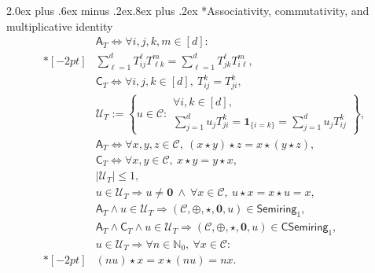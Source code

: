 \documentclass[10pt,a5paper]{article}
\makeatletter
\renewcommand\section{\@startsection{section}{1}{\z@}%
  {2.0ex plus .6ex minus .2ex}{.8ex plus .2ex}%
  {\normalfont\large\bfseries}}
\makeatother
\begin{document}
\section*{Associativity, commutativity, and multiplicative identity}
\begin{align*}
&\mathsf A_T
\iff{}
\forall i,j,k,m\in[d]:
\\*[-2pt]
&\sum_{\ell=1}^{d}
T_{ij}^{\ell}T_{\ell k}^{m}
=
\sum_{\ell=1}^{d}
T_{jk}^{\ell}T_{i\ell}^{m},
\\
&\mathsf C_T
\iff{}
\forall i,j,k\in[d],\
T_{ij}^{k}=T_{ji}^{k},
\\
&\mathcal U_T
:={}
\left\{
u\in\mathcal C:
\begin{array}{l}
\displaystyle
\forall i,k\in[d],\\[2pt]
\displaystyle
\sum_{j=1}^{d}u_jT_{ji}^{k}
=
\mathbf 1_{\{i=k\}}
=
\sum_{j=1}^{d}u_jT_{ij}^{k}
\end{array}
\right\},
\\
&\mathsf A_T
\iff{}
\forall x,y,z\in\mathcal C,\
(x\star y)\star z=x\star(y\star z),
\\
&\mathsf C_T
\iff{}
\forall x,y\in\mathcal C,\
x\star y=y\star x,
\\
&|\mathcal U_T|\leq1,
\\
&u\in\mathcal U_T
\Longrightarrow{}
u\neq\mathbf 0
\ \land\
\forall x\in\mathcal C,\
u\star x=x\star u=x,
\\
&\mathsf A_T\land u\in\mathcal U_T
\Longrightarrow{}
(\mathcal C,\oplus,\star,\mathbf 0,u)
\in\mathsf{Semiring}_1,
\\
&\mathsf A_T\land\mathsf C_T
\land u\in\mathcal U_T
\Longrightarrow{}
(\mathcal C,\oplus,\star,\mathbf 0,u)
\in\mathsf{CSemiring}_1,
\\
&u\in\mathcal U_T
\Longrightarrow{}
\forall n\in\mathbb N_0,\ \forall x\in\mathcal C:
\\*[-2pt]
&(nu)\star x=x\star(nu)=nx.
\end{align*}

\end{document}

